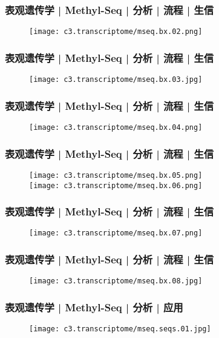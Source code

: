\begin{frame}
  \frametitle{表观遗传学 | Methyl-Seq | 分析 | 流程 | 生信}
  \begin{figure}
    \centering
    \texttt{[image: c3.transcriptome/mseq.bx.02.png]}
  \end{figure}
\end{frame}

\begin{frame}
  \frametitle{表观遗传学 | Methyl-Seq | 分析 | 流程 | 生信}
  \begin{figure}
    \centering
    \texttt{[image: c3.transcriptome/mseq.bx.03.jpg]}
  \end{figure}
\end{frame}

\begin{frame}
  \frametitle{表观遗传学 | Methyl-Seq | 分析 | 流程 | 生信}
  \begin{figure}
    \centering
    \texttt{[image: c3.transcriptome/mseq.bx.04.png]}
  \end{figure}
\end{frame}

\begin{frame}
  \frametitle{表观遗传学 | Methyl-Seq | 分析 | 流程 | 生信}
  \begin{figure}
    \centering
    \texttt{[image: c3.transcriptome/mseq.bx.05.png]}\\
    \texttt{[image: c3.transcriptome/mseq.bx.06.png]}
  \end{figure}
\end{frame}

\begin{frame}
  \frametitle{表观遗传学 | Methyl-Seq | 分析 | 流程 | 生信}
  \begin{figure}
    \centering
    \texttt{[image: c3.transcriptome/mseq.bx.07.png]}
  \end{figure}
\end{frame}

\begin{frame}
  \frametitle{表观遗传学 | Methyl-Seq | 分析 | 流程 | 生信}
  \begin{figure}
    \centering
    \texttt{[image: c3.transcriptome/mseq.bx.08.jpg]}
  \end{figure}
\end{frame}

\begin{frame}
  \frametitle{表观遗传学 | Methyl-Seq | 分析 | 应用}
  \begin{figure}
    \centering
    \texttt{[image: c3.transcriptome/mseq.seqs.01.jpg]}
  \end{figure}
\end{frame}

